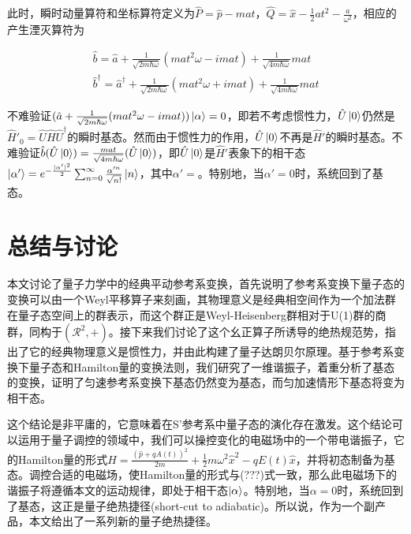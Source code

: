 \documentclass[a4paper]{article}
\begin{document}
            此时，瞬时动量算符和坐标算符定义为$\hat{P}=\hat{p}-mat$，$\hat{Q}=\hat{x}-\frac{1}{2}at^2-\frac{a}{\omega^2}$，相应的产生湮灭算符为

            \begin{equation}
                \begin{array}{lr}
                    \hat{b}=\hat{a}+\frac{1}{\sqrt{2m\hbar\omega}}(mat^2\omega-imat)+\frac{1}{\sqrt{4m\hbar\omega}}mat \\
                    \hat{b}^\dagger=\hat{a}^\dagger+\frac{1}{\sqrt{2m\hbar\omega}}(mat^2\omega+imat)+\frac{1}{\sqrt{4m\hbar\omega}}mat
                \end{array}
            \end{equation}

            不难验证$(\hat{a}+\frac{1}{\sqrt{2m\hbar\omega}}(mat^2\omega-imat))\ket{\alpha}=0$，即若不考虑惯性力，$\hat{U}\ket{0}$仍然是$\hat{H}'_0=\hat{U}\hat{H}\hat{U}^\dagger$的瞬时基态。然而由于惯性力的作用，$\hat{U}\ket{0}$不再是$\hat{H}'$的瞬时基态。不难验证$\hat{b}(\hat{U}\ket{0})=\frac{mat}{\sqrt{4m\hbar\omega}}(\hat{U}\ket{0})$，即$\hat{U}\ket{0}$是$\hat{H}'$表象下的相干态$\ket{\alpha'}=e^{-\frac{|\alpha'|^2}{2}}\sum_{n=0}^\infty\frac{\alpha'^n}{\sqrt{n!}}\ket{n}$，其中$\alpha'=$。特别地，当$\alpha'=0$时，系统回到了基态。




    \section{总结与讨论}

        本文讨论了量子力学中的经典平动参考系变换，首先说明了参考系变换下量子态的变换可以由一个Weyl平移算子来刻画，其物理意义是经典相空间作为一个加法群在量子态空间上的群表示，而这个群正是Weyl-Heisenberg群相对于U(1)群的商群，同构于$(\mathcal{R}^2,+)$。接下来我们讨论了这个幺正算子所诱导的绝热规范势，指出了它的经典物理意义是惯性力，并由此构建了量子达朗贝尔原理。基于参考系变换下量子态和Hamilton量的变换法则，我们研究了一维谐振子，着重分析了基态的变换，证明了匀速参考系变换下基态仍然变为基态，而匀加速情形下基态将变为相干态。

        这个结论是非平庸的，它意味着在S'参考系中量子态的演化存在激发。这个结论可以运用于量子调控的领域中，我们可以操控变化的电磁场中的一个带电谐振子，它的Hamilton量的形式$\hat{H}=\frac{(\hat{p}+qA(t))^2}{2m}+\frac{1}{2}m\omega^2\hat{x}^2-qE(t)\hat{x}$，并将初态制备为基态。调控合适的电磁场，使Hamilton量的形式与(???)式一致，那么此电磁场下的谐振子将遵循本文的运动规律，即处于相干态$\ket{\alpha}$。特别地，当$\alpha=0$时，系统回到了基态，这正是量子绝热捷径(short-cut to adiabatic)。所以说，作为一个副产品，本文给出了一系列新的量子绝热捷径。
\end{document}
